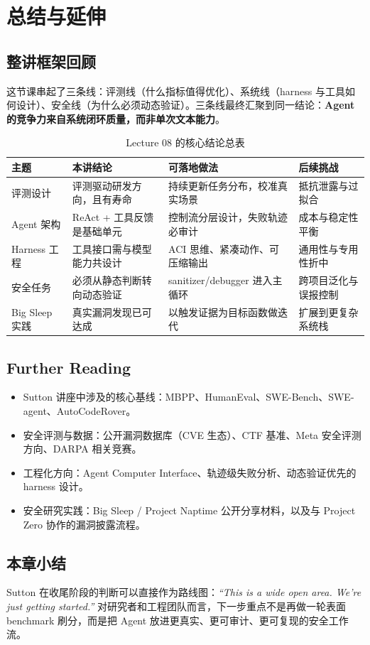 \section{总结与延伸}

\subsection{整讲框架回顾}
这节课串起了三条线：评测线（什么指标值得优化）、系统线（harness 与工具如何设计）、安全线（为什么必须动态验证）。三条线最终汇聚到同一结论：\textbf{Agent 的竞争力来自系统闭环质量，而非单次文本能力}。

\begin{table}[H]
\centering
\begin{tabular}{p{3.1cm}p{4.4cm}p{4.2cm}p{2.6cm}}
\toprule
\textbf{主题} & \textbf{本讲结论} & \textbf{可落地做法} & \textbf{后续挑战} \\
\midrule
评测设计 & 评测驱动研发方向，且有寿命 & 持续更新任务分布，校准真实场景 & 抵抗泄露与过拟合 \\
Agent 架构 & ReAct + 工具反馈是基础单元 & 控制流分层设计，失败轨迹必审计 & 成本与稳定性平衡 \\
Harness 工程 & 工具接口需与模型能力共设计 & ACI 思维、紧凑动作、可压缩输出 & 通用性与专用性折中 \\
安全任务 & 必须从静态判断转向动态验证 & sanitizer/debugger 进入主循环 & 跨项目泛化与误报控制 \\
Big Sleep 实践 & 真实漏洞发现已可达成 & 以触发证据为目标函数做迭代 & 扩展到更复杂系统栈 \\
\bottomrule
\end{tabular}
\caption{Lecture 08 的核心结论总表}
\end{table}

\subsection{Further Reading}
\begin{itemize}
    \item Sutton 讲座中涉及的核心基线：MBPP、HumanEval、SWE-Bench、SWE-agent、AutoCodeRover。
    \item 安全评测与数据：公开漏洞数据库（CVE 生态）、CTF 基准、Meta 安全评测方向、DARPA 相关竞赛。
    \item 工程化方向：Agent Computer Interface、轨迹级失败分析、动态验证优先的 harness 设计。
    \item 安全研究实践：Big Sleep / Project Naptime 公开分享材料，以及与 Project Zero 协作的漏洞披露流程。
\end{itemize}

\subsection{本章小结}
Sutton 在收尾阶段的判断可以直接作为路线图：\textit{``This is a wide open area. We're just getting started.''} 对研究者和工程团队而言，下一步重点不是再做一轮表面 benchmark 刷分，而是把 Agent 放进更真实、更可审计、更可复现的安全工作流。


